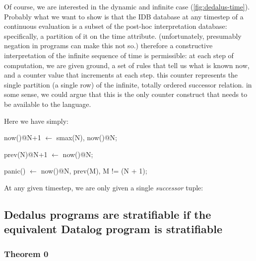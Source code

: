 Of course, we are interested in the dynamic and infinite case (\ref{fig:dedalus-time}).
Probably what we want to show is that the IDB database at any timestep of a continuous evaluation is a subset
of the post-hoc interpretation database: specifically, a partition of it on the time attribute.  (unfortunately, presumably
negation in programs can make this not so.)  therefore a constructive interpretation of the infinite sequence of time is permissible:
at each step of computation, we are given ground, a set of rules that tell us what is known now, and a counter value that increments
at each step.  this counter represents the single partition (a single row) of the infinite, totally ordered successor relation.
in some sense, we could argue that this is the only counter construct that needs to be available to the language.

Here we have simply:

\begin{Dedalus}
now()@N+1  \(\leftarrow\)
    smax(N),
    now()@N;

prev(N)@N+1  \(\leftarrow\)
    now()@N;

panic()  \(\leftarrow\)
    now()@N,
    prev(M),
    M != (N + 1);
\end{Dedalus}

At any given timestep, we are only given a single \emph{successor} tuple: 

\subsection{Dedalus programs are stratifiable if the equivalent Datalog program is stratifiable}

\subsubsection{Theorem 0}

